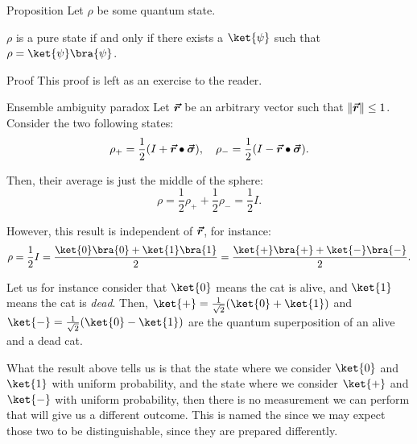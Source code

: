 \documentclass[a4paper]{article}
\begin{document}
\begin{parag}{Proposition}
    Let $\rho$ be some quantum state. 

    $\rho$ is a pure state if and only if there exists a $\ket{\psi}$ such that $\rho = \ket{\psi}\bra{\psi}$.

    \begin{subparag}{Proof}
        This proof is left as an exercise to the reader.
    \end{subparag}
\end{parag}

\begin{parag}{Ensemble ambiguity paradox}
    Let $\bm{\protect\vec{r}}$ be an arbitrary vector such that $\left\|\bvec{r}\right\| \leq 1$. Consider the two following states: 
    \[\rho_+ = \frac{1}{2}\left(I + \bvec{r} \dotprod \bvec{\sigma}\right), \mathspace \rho_- = \frac{1}{2}\left(I - \bvec{r} \dotprod \bvec{\sigma}\right).\]
    
    Then, their average is just the middle of the sphere: 
    \[\rho = \frac{1}{2} \rho_+ + \frac{1}{2}\rho_- = \frac{1}{2} I.\]

    However, this result is independent of $\bm{\protect\vec{r}}$, for instance: 
    \[\rho = \frac{1}{2} I = \frac{\ket{0}\bra{0} + \ket{1}\bra{1}}{2} = \frac{\ket{+}\bra{+} + \ket{-}\bra{-}}{2}.\]
    
    Let us for instance consider that $\ket{0}$ means the cat is alive, and $\ket{1}$ means the cat is \textit{dead}. Then, $\ket{+} = \frac{1}{\sqrt{2}}\left(\ket{0} + \ket{1}\right)$ and $\ket{-} = \frac{1}{\sqrt{2}}\left(\ket{0} - \ket{1}\right)$ are the quantum superposition of an alive and a dead cat. 
    
    What the result above tells us is that the state where we consider $\ket{0}$ and $\ket{1}$ with uniform probability, and the state where we consider $\ket{+}$ and $\ket{-}$ with uniform probability, then there is no measurement we can perform that will give us a different outcome. This is named the  since we may expect those two to be distinguishable, since they are prepared differently.
\end{parag}
\end{document}
